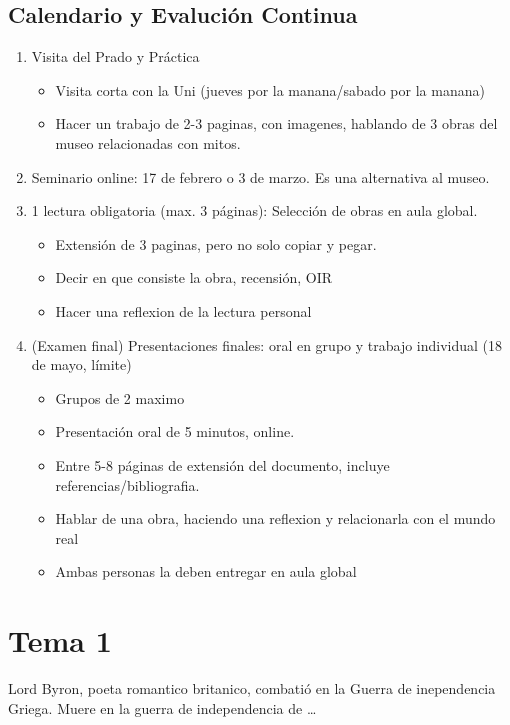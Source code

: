 \documentclass[12pt, twoside, openright]{report} %
\begin{document}
\section{Calendario y Evalución Continua}
\begin{enumerate}
    \item Visita del Prado y Práctica
    \begin{itemize}
      \item Visita corta con la Uni (jueves por la manana/sabado por la manana)
      \item Hacer un trabajo de 2-3 paginas, con imagenes, hablando de 3 obras del museo relacionadas con mitos.
    \end{itemize}
  \item Seminario online: 17 de febrero o 3 de marzo. Es una alternativa al museo.
  \item 1 lectura obligatoria (max. 3 páginas): Selección de obras en aula global.
    \begin{itemize}
      \item Extensión de 3 paginas, pero no solo copiar y pegar.
      \item Decir en que consiste la obra, recensión, OIR
      \item Hacer una reflexion de la lectura personal
    \end{itemize}
  \item (Examen final) Presentaciones finales: oral en grupo y trabajo individual (18 de mayo, límite)
    \begin{itemize}
      \item Grupos de 2 maximo
      \item Presentación oral de 5 minutos, online.
      \item Entre 5-8 páginas de extensión del documento, incluye referencias/bibliografia.
      \item Hablar de una obra, haciendo una reflexion y relacionarla con el mundo real
      \item Ambas personas la deben entregar en aula global
    \end{itemize}
\end{enumerate}

\chapter{Tema 1}
Lord Byron, poeta romantico britanico, combatió en la Guerra de inependencia Griega.
  Muere en la guerra de independencia de \ldots
\end{document}
